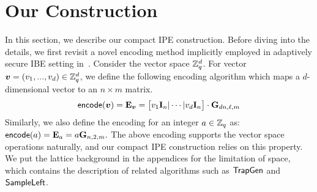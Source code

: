 \section{Our Construction}
In this section, we describe our compact IPE construction. Before diving into the details, we first revisit a novel encoding method implicitly employed in adaptively secure IBE setting in~\cite{EPRINT:ApoFanLiu16a}. Consider the vector space $\mathbb{Z}_q^d$. For vector $\boldsymbol{v} = (v_1,..., v_d) \in \mathbb{Z}_q^d$, we define the following encoding algorithm which maps a $d$-dimensional vector to an $n \times m$ matrix.
\begin{equation} \label{equ:enc}
\mathsf{encode}(\boldsymbol{v}) = \mathbf{E}_{\boldsymbol{v}} = \big[v_1 \mathbf{I}_n | \cdots | v_d \mathbf{I}_n \big] \cdot
\mathbf{G}_{dn, \ell, m}
\end{equation}
Similarly, we also define the encoding for an integer $a \in \mathbb{Z}_q$ as:
$\mathsf{encode}(a) = \mathbf{E}_a = a \mathbf{G}_{n, 2, m}.$ The above encoding supports the vector space operations naturally, and our compact IPE construction relies on this property.\\
We put the lattice background in the appendices for the limitation of space, which contains the description of related algorithms such as $\mathsf{TrapGen}$ and $\mathsf{SampleLeft} $.

